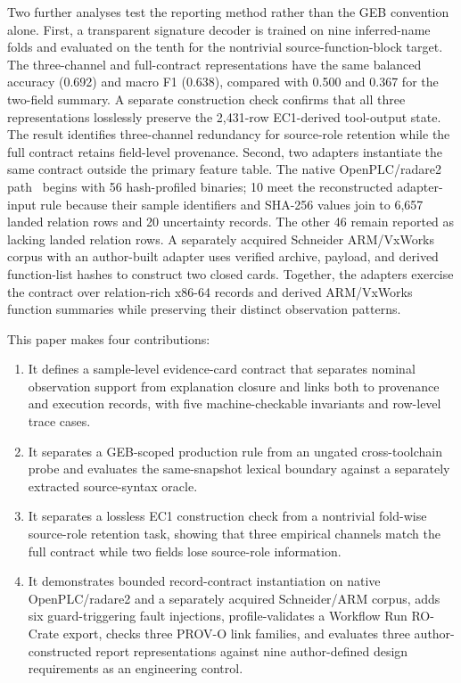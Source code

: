 \documentclass[a4paper,fleqn]{cas-dc}
\begin{document}
Two further analyses test the reporting method rather than the GEB convention alone. First, a transparent signature decoder is trained on nine inferred-name folds and evaluated on the tenth for the nontrivial source-function-block target. The three-channel and full-contract representations have the same balanced accuracy (0.692) and macro F1 (0.638), compared with 0.500 and 0.367 for the two-field summary. A separate construction check confirms that all three representations losslessly preserve the 2{,}431-row EC1-derived tool-output state. The result identifies three-channel redundancy for source-role retention while the full contract retains field-level provenance. Second, two adapters instantiate the same contract outside the primary feature table. The native OpenPLC/radare2 path~\citep{radare2} begins with 56 hash-profiled binaries; 10 meet the reconstructed adapter-input rule because their sample identifiers and SHA-256 values join to 6{,}657 landed relation rows and 20 uncertainty records. The other 46 remain reported as lacking landed relation rows. A separately acquired Schneider ARM/VxWorks corpus with an author-built adapter uses verified archive, payload, and derived function-list hashes to construct two closed cards. Together, the adapters exercise the contract over relation-rich x86-64 records and derived ARM/VxWorks function summaries while preserving their distinct observation patterns.

This paper makes four contributions:

\begin{enumerate}
\item It defines a sample-level evidence-card contract that separates nominal observation support from explanation closure and links both to provenance and execution records, with five machine-checkable invariants and row-level trace cases.
\item It separates a GEB-scoped production rule from an ungated cross-toolchain probe and evaluates the same-snapshot lexical boundary against a separately extracted source-syntax oracle.
\item It separates a lossless EC1 construction check from a nontrivial fold-wise source-role retention task, showing that three empirical channels match the full contract while two fields lose source-role information.
\item It demonstrates bounded record-contract instantiation on native OpenPLC/radare2 and a separately acquired Schneider/ARM corpus, adds six guard-triggering fault injections, profile-validates a Workflow Run RO-Crate export, checks three PROV-O link families, and evaluates three author-constructed report representations against nine author-defined design requirements as an engineering control.
\end{enumerate}
\end{document}
